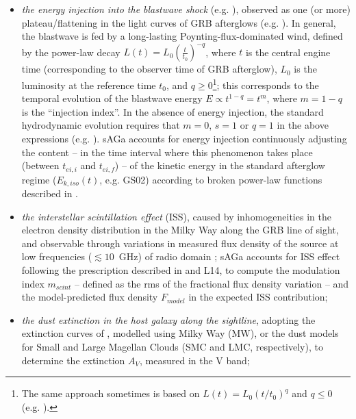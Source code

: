 \documentclass{aa}
\begin{document}
\begin{itemize}
{\sc sAGa} accounts for the NR regime modifying the evolution of the spectral break frequencies and flux densities at $t_{NR}$ (\citealt{Frail00a,Vaneerten10b,Leventis12}), smoothing over the transition with a fixed smoothing parameter ($s = 5$, \citealt{Granot01}).
%
\item \textit{the energy injection into the blastwave shock} (e.g. \citealt{Zhang02c,Granot06,Gao13b}), observed as one (or more) plateau/flattening in the light curves of GRB afterglows (e.g. \citealt{Nousek06,Liang07,Margutti10,Hascoet12}).
In general, the blastwave is fed by a long-lasting Poynting-flux-dominated wind, defined by the power-law decay $L(t) = L_0 \left(\frac{t}{t_0}\right)^{-q}$, where $t$ is the central engine time (corresponding to the observer time of GRB afterglow), $L_0$ is the luminosity at the reference time $t_0$, and $q \geq 0$\footnote{The same approach sometimes is based on $L(t) = L_0 (t/t_0)^q$ and $q \leq 0$ (e.g. \citealt{Misra07,Marshall11,Vaneerten14b,Laskar15}).}; this corresponds to the temporal evolution of the blastwave energy $E \propto t^{1 - q} = t^m$, where $m = 1 - q$ is the ``injection index''.
In the absence of energy injection, the standard hydrodynamic evolution requires that $m = 0$, $s = 1$ or $q = 1$ in the above expressions (e.g. \citealt{Gao13}).
{\sc sAGa} accounts for energy injection continuously adjusting the content -- in the time interval where this phenomenon takes place (between $t_{ei,i}$ and $t_{ei,f}$) -- of the kinetic energy in the standard afterglow regime ($E_{k,iso}(t)$, e.g. GS02) according to broken power-law functions described in \citealt{Laskar15}.
%
\item \textit{the interstellar scintillation effect} (ISS), caused by inhomogeneities in the electron density distribution in the Milky Way along the GRB line of sight, and observable through variations in measured flux density of the source at low frequencies ($\lesssim 10$~GHz) of radio domain \citep{Rickett90,Goodman97,Walker98,Frail97,Frail00a,Goodman06,Granot14,Misra19}; {\sc sAGa} accounts for ISS effect following the prescription described in \citep{Goodman06} and L14, to compute the modulation index $m_{scint}$ -- defined as the rms of the fractional flux density variation -- and the model-predicted flux density $F_{model}$ in the expected ISS contribution;
%
\item \textit{the dust extinction in the host galaxy along the sightline}, adopting the extinction curves of \citet{Pei92}, modelled using Milky Way (MW), or the dust models for Small and Large Magellan Clouds (SMC and LMC, respectively), to determine the extinction $A_V$, measured in the V band;

\end{itemize}
\end{document}
